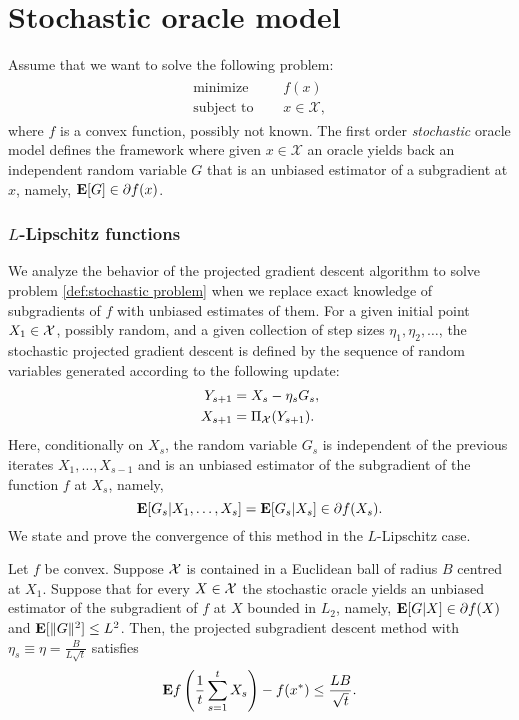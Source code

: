 
\section{Stochastic oracle model}

Assume that we want to solve the following problem:
\begin{align}
	\begin{aligned}
		\text{minimize }\quad   & f(x) \\
		\text{subject to }\quad & x\in \mathcal{X},
	\end{aligned}
	\label{def:stochastic problem}
\end{align}
where $f$ is a convex function, possibly not known. The first order \emph{stochastic} oracle model defines the framework where given $x\in\mathcal{X}$ an oracle yields back an independent random variable $G$ that is an unbiased estimator of a subgradient at $x$, namely, $\mathbf{E}[G] \in \partial f(x)$.

\subsubsection*{$L$-Lipschitz functions}
We analyze the behavior of the projected gradient descent algorithm to solve problem \eqref{def:stochastic problem} when we replace exact knowledge of subgradients of $f$ with unbiased estimates of them. For a given initial point $X_1\in\mathcal{X}$, possibly random, and a given collection of step sizes $\eta_1,\eta_2,\ldots$, the stochastic projected gradient descent is defined by the sequence of random variables generated according to the following update:
\begin{align*}
Y_{s+1} &= X_s - \eta_s G_s,\\
X_{s+1} &= \Pi_{\mathcal{X}}(Y_{s+1}).
\end{align*}
Here, conditionally on $X_s$, the random variable $G_s$ is independent of the previous iterates $X_1,\ldots,X_{s-1}$ and is an unbiased estimator of the subgradient of the function $f$ at $X_s$, namely,
$$
	\mathbf{E}[G_s|X_1,\ldots,X_s] = \mathbf{E}[G_s|X_s] \in\partial f(X_s).
$$
We state and prove the convergence of this method in the $L$-Lipschitz case.

\begin{theorem}
\label{thm:projectedgradLstoch}
Let $f$ be convex. Suppose $\mathcal{X}$ is contained in a Euclidean ball of radius $B$ centred at $X_1$. Suppose that for every $X \in \mathcal{X}$ the stochastic oracle yields an unbiased estimator of the subgradient of $f$ at $X$ bounded in $L_2$, namely, $\mathbf{E}[G |X]\in \partial f(X)$ and $\mathbf{E}[\|G\|^2] \leq L^2$. Then, the projected subgradient descent method with $\eta_s\equiv\eta = \frac{B}{L\sqrt{t}}$ satisfies 
\begin{equation} \label{eqn:proj_subgrad_t stoch}
\mathbf{E} f\left(\frac{1}{t} \sum_{s=1}^t X_s\right) - f(x^*) \leq \frac{LB}{\sqrt{t}}.
\end{equation}
\end{theorem}

